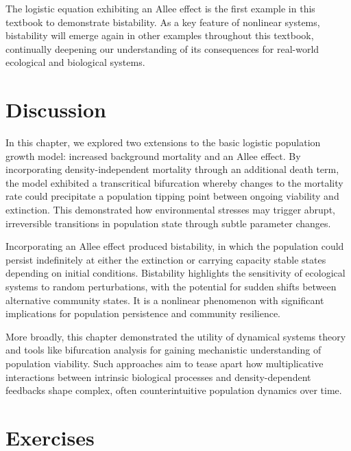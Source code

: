 The logistic equation exhibiting an Allee effect is the first example in this textbook to demonstrate bistability. As a key feature of nonlinear systems, bistability will emerge again in other examples throughout this textbook, continually deepening our understanding of its consequences for real-world ecological and biological systems.

\section{Discussion}

In this chapter, we explored two extensions to the basic logistic population growth model: increased background mortality and an Allee effect. By incorporating density-independent mortality through an additional death term, the model exhibited a transcritical bifurcation whereby changes to the mortality rate could precipitate a population tipping point between ongoing viability and extinction. This demonstrated how environmental stresses may trigger abrupt, irreversible transitions in population state through subtle parameter changes.

Incorporating an Allee effect produced bistability, in which the population could persist indefinitely at either the extinction or carrying capacity stable states depending on initial conditions. Bistability highlights the sensitivity of ecological systems to random perturbations, with the potential for sudden shifts between alternative community states. It is a nonlinear phenomenon with significant implications for population persistence and community resilience.

More broadly, this chapter demonstrated the utility of dynamical systems theory and tools like bifurcation analysis for gaining mechanistic understanding of population viability. Such approaches aim to tease apart how multiplicative interactions between intrinsic biological processes and density-dependent feedbacks shape complex, often counterintuitive population dynamics over time. 

\section*{Exercises}

